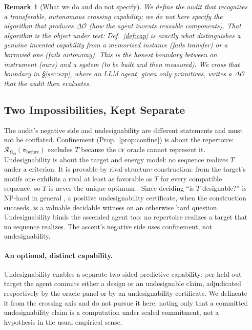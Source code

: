 \documentclass[11pt]{article}
\newtheorem{remark}{Remark}
\newcommand{\CF}{\textsc{cf}}
\newcommand{\Ocf}{\ensuremath{\Omega_{\mathrm{cf}}}}
\newcommand{\Rze}[2]{\ensuremath{\mathcal{R}_{#1}(#2)}}
\begin{document}
\begin{remark}[What we do and do not specify]\label{rem:scope}
We define the \emph{audit} that recognizes a transferable, autonomous crossing capability; we do \emph{not} here
specify the algorithm that \emph{produces} $\Delta\mathcal{O}$ (how the agent invents reusable components).
That algorithm is the \emph{object under test}: Def.~\ref{def:cap} is exactly what distinguishes a genuine
invented capability from a memorized instance (fails transfer) or a borrowed one (fails autonomy). This is
the honest boundary between an instrument (ours) and a system (to be built and then measured). We cross that
boundary in \S\ref{sec:exp}, where an LLM agent, given only primitives, \emph{writes} a $\Delta\mathcal O$ that
the audit then evaluates.
\end{remark}


\subsection{Two Impossibilities, Kept Separate}\label{sec:impossible}
The audit's negative side and undesignability are different statements and must not be conflated.
Confinement (Prop.~\ref{prop:confine}) is about the repertoire: $\Rze{\Ocf}{\pi_{\mathrm{before}}}$ excludes
$T$ because the \CF{} oracle cannot represent it. Undesignability \citep{zhou2024rigende} is about the target
and energy model: no sequence realizes $T$ under a criterion. It is provable by rival-structure
construction: from the target's motifs one exhibits a rival at least as favorable as $T$ for every
compatible sequence, so $T$ is never the unique optimum \citep{zhou2024rigende,zhou2025motifs}. Since
deciding ``is $T$ designable?'' is NP-hard in general \citep{bonnet2020hard}, a positive undesignability
certificate, when the construction succeeds, is a valuable decidable witness on an otherwise hard question.
Undesignability binds the ascended agent too: no repertoire realizes a target that no sequence realizes. The
ascent's negative side uses confinement, not undesignability.

\paragraph{An optional, distinct capability.} Undesignability enables a separate two-sided predictive
capability: per held-out target the agent commits either a design or an undesignable claim, adjudicated
respectively by the oracle panel or by an undesignability certificate. We delineate it from the crossing axis
and do not pursue it here, noting only that a committed undesignability claim is a computation under sealed commitment, not a hypothesis in the usual empirical sense.
\end{document}
